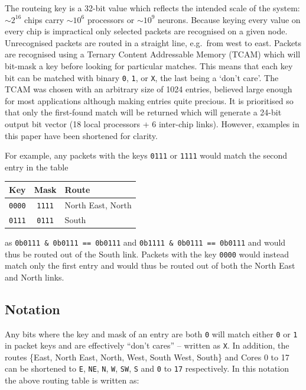\documentclass[conference]{IEEEtran}
\newcommand{\mytt}[1]{\texttt{\footnotesize#1}}
\begin{document}
The routeing key is a 32-bit value which reflects the intended scale of the system: $\sim2^{16}$ chips carry $\sim10^6$ processors or $\sim10^9$ neurons.
Because keying every value on every chip is impractical only selected packets are recognised on a given node.
Unrecognised packets are routed in a straight line, e.g.\ from west to east.
Packets are recognised using a Ternary Content Addressable Memory (TCAM) which will bit-mask a key before looking for particular matches.
This means that each key bit can be matched with binary \mytt{0}, \mytt{1}, or \mytt{X}, the last being a `don't care'.
The TCAM was chosen with an arbitrary size of 1024 entries, believed large enough for most applications although making entries quite precious.
It is prioritised so that only the first-found match will be returned which will generate a 24-bit output bit vector (18 local processors + 6 inter-chip links).
However, examples in this paper have been shortened for clarity.

  For example, any packets with the keys \mytt{0111} or \mytt{1111} would match the second entry in the table

  \begin{table}[H]
    \centering
    \begin{tabular}{c c l}
      \toprule
      Key & Mask & Route \\
      \midrule
      \texttt{0000} & \texttt{1111} & North East, North \\
      \texttt{0111} & \texttt{0111} & South \\
      \bottomrule
    \end{tabular}
  \end{table}

  \noindent as \mytt{0b0111 \& 0b0111 == 0b0111} and \mytt{0b1111 \& 0b0111 == 0b0111} and would thus be routed out of the South link.
  Packets with the key \mytt{0000} would instead match only the first entry and would thus be routed out of both the North East and North links.

  \subsection{Notation}

  Any bits where the key and mask of an entry are both \mytt{0} will match either \mytt{0} or \mytt{1} in packet keys and are effectively ``don't cares'' -- written as \mytt{X}.
  In addition, the routes \{East, North East, North, West, South West, South\} and Cores 0 to 17 can be shortened to \mytt{E}, \mytt{NE}, \mytt{N}, \mytt{W}, \mytt{SW}, \mytt{S} and \mytt{0} to \mytt{17} respectively.
  In this notation the above routing table is written as:
\end{document}
